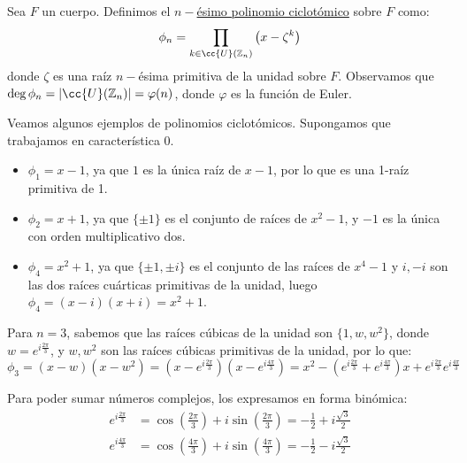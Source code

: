 \begin{definicion}
    Sea $F$ un cuerpo. Definimos el \underline{$n-$ésimo polinomio ciclotómico} sobre $F$ como:
    \begin{equation*}
        \phi_n = \prod_{k\in \cc{U}(\mathbb{Z}_n)} \left(x-\zeta^k\right)
    \end{equation*}
    donde $\zeta$ es una raíz $n-$ésima primitiva de la unidad sobre $F$. Observamos que $\deg\phi_n = |\cc{U}(\mathbb{Z}_n)| = \varphi(n)$, donde $\varphi$ es la función de Euler.
\end{definicion}

\begin{ejemplo}\label{ejemplo:polinomios_ciclotomicos_definicion}
    Veamos algunos ejemplos de polinomios ciclotómicos. Supongamos que trabajamos en característica $0$.
    \begin{itemize}
        \item $\phi_1 = x-1$, ya que $1$ es la única raíz de $x-1$, por lo que es una 1-raíz primitiva de 1.
        \item $\phi_2 = x+1$, ya que $\{\pm 1\}$ es el conjunto de raíces de $x^2-1$, y $-1$ es la única con orden multiplicativo dos.
        \item $\phi_4 = x^2+1$, ya que $\{\pm 1, \pm i\}$ es el conjunto de las raíces de $x^4-1$ y $i,-i$ son las dos raíces cuárticas primitivas de la unidad, luego $\phi_4 = (x-i)(x+i) = x^2+1$.
    \end{itemize}

    Para $n=3$, sabemos que las raíces cúbicas de la unidad son $\{1,w,w^2\}$, donde $w=e^{i\frac{2\pi}{3}}$, y $w,w^2$ son las raíces cúbicas primitivas de la unidad, por lo que:
    \begin{equation*}
        \phi_3 = (x-w)(x-w^2) = \left(x-e^{i\frac{2\pi}{3}}\right)\left(x-e^{i\frac{4\pi}{3}}\right) = x^2-\left(e^{i\frac{2\pi}{3}}+e^{i\frac{4\pi}{3}}\right)x + e^{i\frac{2\pi}{3}}e^{i\frac{4\pi}{3}}
    \end{equation*}

    Para poder sumar números complejos, los expresamos en forma binómica:
    \begin{align*}
        e^{i\frac{2\pi}{3}} &= \cos\left(\frac{2\pi}{3}\right) + i\sin\left(\frac{2\pi}{3}\right) = -\frac{1}{2} + i\frac{\sqrt{3}}{2} \\
        e^{i\frac{4\pi}{3}} &= \cos\left(\frac{4\pi}{3}\right) + i\sin\left(\frac{4\pi}{3}\right) = -\frac{1}{2} - i\frac{\sqrt{3}}{2}
    \end{align*}


\end{ejemplo}
